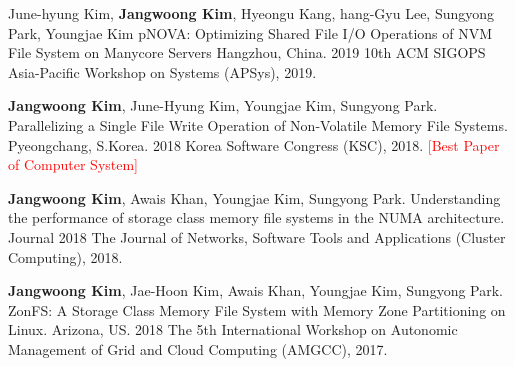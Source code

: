 

\begin{cventries}


  \cventry
    {June-hyung Kim, \textbf{Jangwoong Kim}, Hyeongu Kang, hang-Gyu Lee, Sungyong Park, Youngjae Kim} %
    {pNOVA: Optimizing Shared File I/O Operations of NVM File System on Manycore Servers} %
    {Hangzhou, China.} %
    {2019} %
    {
      10th ACM SIGOPS Asia-Pacific Workshop on Systems (APSys), 2019.
    }

  \cventry
	{\textbf{Jangwoong Kim}, June-Hyung Kim, Youngjae Kim,  Sungyong Park.}
	{Parallelizing a Single File Write Operation of Non-Volatile Memory File Systems.}
	{Pyeongchang, S.Korea.}
	{2018}
	{
		Korea Software Congress (KSC), 2018. \textcolor{red}{[Best Paper of Computer System]}
	}

  \cventry
	{\textbf{Jangwoong Kim},  Awais Khan,  Youngjae Kim,  Sungyong Park.}
	{Understanding the performance of storage class memory file systems in the NUMA architecture.}
	{Journal}
	{2018}
	{
		The Journal of Networks, Software Tools and Applications (Cluster Computing), 2018.
	}

  \cventry
	{\textbf{Jangwoong Kim}, Jae-Hoon Kim,  Awais Khan,  Youngjae Kim,  Sungyong Park.}
	{ZonFS: A Storage Class Memory File System with Memory Zone Partitioning on Linux.}
	{Arizona, US.}
	{2018}
	{
		The 5th International Workshop on Autonomic Management of Grid and Cloud Computing (AMGCC), 2017.
	}


\end{cventries}

\clearpage
